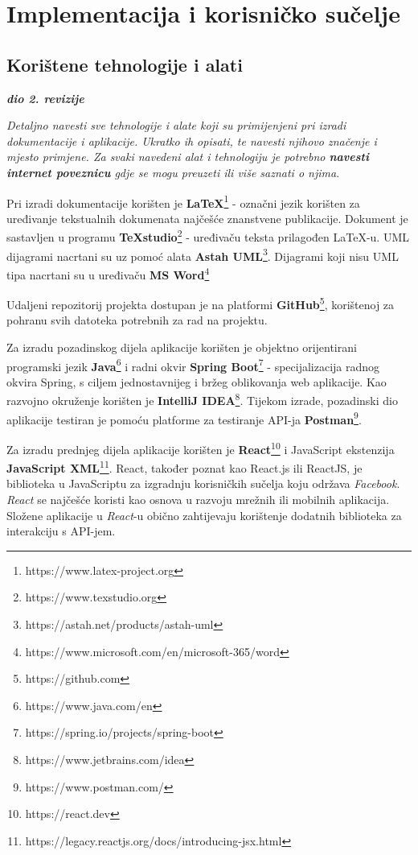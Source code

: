 \chapter{Implementacija i korisničko sučelje}
		
		
		\section{Korištene tehnologije i alati}
		
			\textbf{\textit{dio 2. revizije}}
			
			 \textit{Detaljno navesti sve tehnologije i alate koji su primijenjeni pri izradi dokumentacije i aplikacije. Ukratko ih opisati, te navesti njihovo značenje i mjesto primjene. Za svaki navedeni alat i tehnologiju je potrebno \textbf{navesti internet poveznicu} gdje se mogu preuzeti ili više saznati o njima}.
			
			\indent Pri izradi dokumentacije korišten je \textbf{LaTeX}\footnote{https://www.latex-project.org} - označni jezik korišten za uređivanje tekstualnih dokumenata najčešće znanstvene publikacije. Dokument je sastavljen u programu \textbf{TeXstudio}\footnote{https://www.texstudio.org} - uređivaču teksta prilagođen LaTeX-u. UML dijagrami nacrtani su uz pomoć alata \textbf{Astah UML}\footnote{https://astah.net/products/astah-uml}. Dijagrami koji nisu UML tipa nacrtani su u uređivaču \textbf{MS Word}\footnote{https://www.microsoft.com/en/microsoft-365/word}
			
			Udaljeni repozitorij projekta dostupan je na platformi \textbf{GitHub}\footnote{https://github.com}, korištenoj za pohranu svih datoteka potrebnih za rad na projektu.
			
			Za izradu pozadinskog dijela aplikacije korišten je objektno orijentirani programski jezik \textbf{Java}\footnote{https://www.java.com/en} i radni okvir \textbf{Spring Boot}\footnote{https://spring.io/projects/spring-boot} - specijalizacija radnog okvira Spring, s ciljem jednostavnijeg i bržeg oblikovanja web aplikacije. Kao razvojno okruženje korišten je \textbf{IntelliJ IDEA}\footnote{https://www.jetbrains.com/idea}. Tijekom izrade, pozadinski dio aplikacije testiran je pomoću platforme za testiranje API-ja \textbf{Postman}\footnote{https://www.postman.com/}.
			
			Za izradu prednjeg dijela aplikacije korišten je \textbf{React}\footnote{https://react.dev} i JavaScript ekstenzija \textbf{JavaScript XML}\footnote{https://legacy.reactjs.org/docs/introducing-jsx.html}. React, također poznat kao React.js ili ReactJS, je biblioteka u JavaScriptu za izgradnju korisničkih sučelja koju održava \textit{Facebook}. \textit{React} se najčešće koristi kao osnova u razvoju mrežnih ili mobilnih aplikacija. Složene aplikacije u \textit{React}-u obično zahtijevaju korištenje dodatnih biblioteka za interakciju s API-jem.
			
